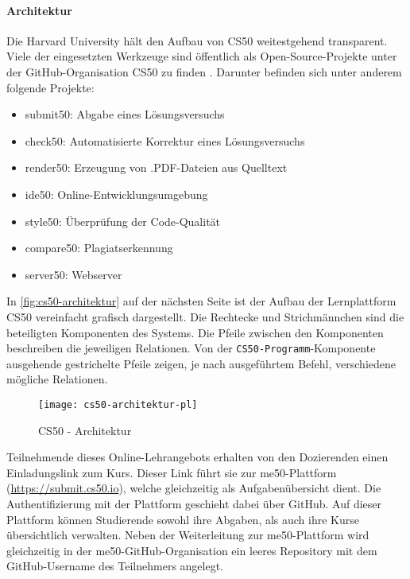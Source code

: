\newpage

\paragraph{Architektur}
Die Harvard University hält den Aufbau von CS50 weitestgehend transparent.
Viele der eingesetzten Werkzeuge sind öffentlich als Open-Source-Projekte unter
der GitHub-Organisation \glqq CS50\grqq{} zu finden \parencite{cs50-github}.
Darunter befinden sich unter anderem folgende Projekte:
\begin{itemize}
\item submit50: Abgabe eines Lösungsversuchs
\item check50: Automatisierte Korrektur eines Lösungsversuchs
\item render50: Erzeugung von .PDF-Dateien aus Quelltext
\item ide50: Online-Entwicklungsumgebung
\item style50: Überprüfung der Code-Qualität
\item compare50: Plagiatserkennung
\item server50: Webserver
\end{itemize}

In \autoref{fig:cs50-architektur} auf der nächsten Seite ist der Aufbau der
Lernplattform CS50 vereinfacht grafisch dargestellt. Die Rechtecke und
Strichmännchen sind die beteiligten Komponenten des Systems. Die Pfeile zwischen
den Komponenten beschreiben die jeweiligen Relationen. Von der
\texttt{CS50-Programm}-Komponente ausgehende gestrichelte Pfeile zeigen, je nach 
ausgeführtem Befehl, verschiedene mögliche Relationen.

\begin{figure}[h]
    \centering
    \texttt{[image: cs50-architektur-pl]}
    \caption{CS50 - Architektur}
    \label{fig:cs50-architektur}
\end{figure}

Teilnehmende dieses Online-Lehrangebots erhalten von den Dozierenden einen
Einladungslink zum Kurs. Dieser Link führt sie zur me50-Plattform
(\url{https://submit.cs50.io}), welche gleichzeitig als Aufgabenübersicht dient. Die
Authentifizierung mit der Plattform geschieht dabei über GitHub. Auf dieser
Plattform können Studierende sowohl ihre Abgaben, als auch ihre Kurse
übersichtlich verwalten. Neben der Weiterleitung zur me50-Plattform wird
gleichzeitig in der me50-GitHub-Organisation ein leeres Repository mit dem
GitHub-Username des Teilnehmers angelegt.

